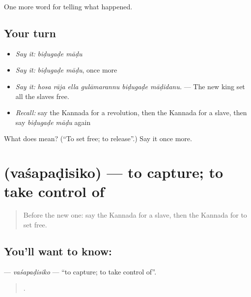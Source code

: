 \begin{grammarlens}[title={What you've built}]
One more word for telling what happened.
\end{grammarlens}

\subsection*{Your turn}
\begin{itemize}
\raggedright
  \item \emph{Say it:} \emph{biḍugaḍe māḍu}
  \item \emph{Say it:} \emph{biḍugaḍe māḍu}, once more
  \item \emph{Say it:} \emph{hosa rāja ella gulāmarannu biḍugaḍe māḍidanu.} — The new king set all the slaves free.
  \item \emph{Recall:} say the Kannada for a revolution, then the Kannada for a slave, then say \emph{biḍugaḍe māḍu} again
\end{itemize}

\begin{tcolorbox}[breakable,colback=teal!4,colframe=teal!35!black,title={Before you move on}]
What does   mean? (\textquotedblleft{}To set free; to release\textquotedblright{}.) Say it once more.
\end{tcolorbox}
\section[\texorpdfstring{\kn{ವಶಪಡಿಸಿಕೊ} (vaśapaḍisiko)}{ವಶಪಡಿಸಿಕೊ (vaśapaḍisiko)}]{ (vaśapaḍisiko) — to capture; to take control of}

\label{lesson:KA-C352-vasapadisiko}



\begin{quote}
Before the new one: say the Kannada for a slave, then the Kannada for to set free.
\end{quote}

\subsection*{You'll want to know: }
\textbf{} — \emph{vaśapaḍisiko} — \textquotedblleft{}to capture; to take control of\textquotedblright{}.

\begin{quote}
  .
\end{quote}

